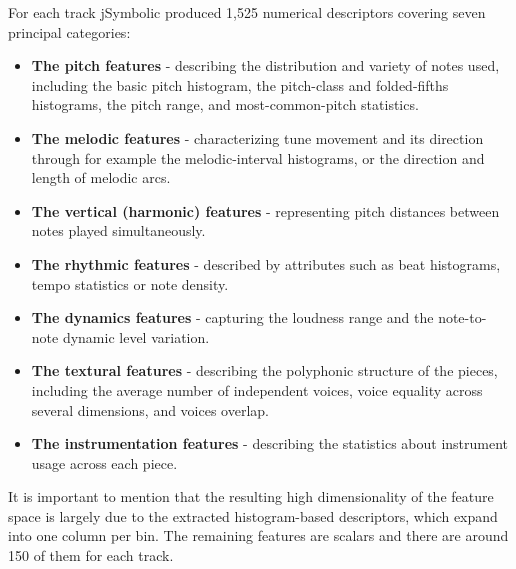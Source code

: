 For each track jSymbolic produced 1,525 numerical descriptors covering seven principal categories: 
\begin{itemize}

    \item\textbf{The pitch features} - describing the distribution and variety of notes used, including the basic pitch histogram, the pitch-class and folded-fifths histograms, the pitch range, and most-common-pitch statistics. 
    \item\textbf{The melodic features} - characterizing tune movement and its direction through for example the melodic-interval histograms, or the direction and length of melodic arcs. 
    \item\textbf{The vertical (harmonic) features} - representing pitch distances between notes played simultaneously. 
    \item\textbf{The rhythmic features} - described by attributes such as beat histograms, tempo statistics or note density.
    \item\textbf{The dynamics features} - capturing the loudness range and the note-to-note dynamic level variation.
    \item\textbf{The textural features} - describing the polyphonic structure of the pieces, including the average number of independent voices, voice equality across several dimensions, and voices overlap.
    \item\textbf{The instrumentation features} - describing the statistics about instrument usage across each piece.
    
\end{itemize}

It is important to mention that the resulting high dimensionality of the feature space is largely due to the extracted histogram-based descriptors, which expand into one column per bin. The remaining features are scalars and there are around 150 of them for each track.


